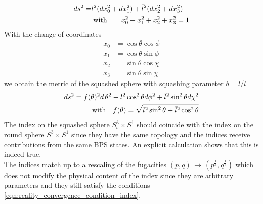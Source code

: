 \begin{align}
 d s^2 =& l^2 ( d x_0^2 + d x_1^2 ) + \bar{l}^2 ( d x_2^2 + d x_3^2) \\
 & \; \hbox{with} \qquad  x_0^2 + x_1^2 + x_2^2 + x_3^2 = 1
\end{align}
With the change of coordinates 
\begin{align}
x_0  & =  \cos \theta \cos \phi \\
x_1  & = \cos \theta \sin \phi \\
x_2  & = \sin \theta \cos \chi \\
x_3  & = \sin \theta \sin \chi 
\end{align}
we obtain the metric of the squashed sphere with squashing parameter 
$b = l/\bar{l}$
\begin{align}
 d s^2 = f(\theta)^2 d \,\theta^2 + l^2 \cos^2 \theta d \phi ^2 + \bar{l}^2 \sin^2 \theta d \chi^2 \\
\hbox{with} \quad f( \theta) = \sqrt{ l^2 \sin^2 \theta + \bar{l}^2 \cos^2 \theta}
\end{align}
The index on the squashed sphere $S_b^3 \times S^1$ should coincide with the index on the round sphere $S^3 \times S^1$ since they have the same topology and the indices receive contributions from the same BPS states.
An explicit calculation \cite{Agarwal:2012hs} shows that this is indeed true. \\
The indices match up to a rescaling of the fugacities $(p,q) \, \rightarrow \, (p^{\frac{1}{a}}, q^{\frac{1}{b}})$ which does not modify the physical content of the index since they are arbitrary parameters and they still satisfy the conditions \eqref{eqn:reality_convergence_condition_index}.

